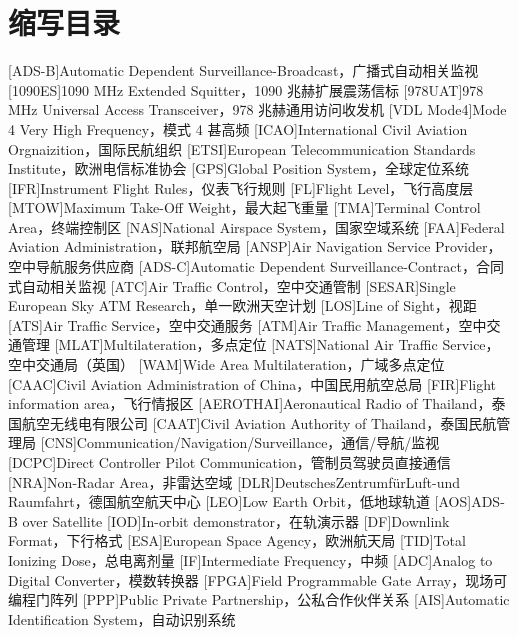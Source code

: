 
\chapter*{缩写目录}

\begin{acronym}
[ADS-B]{Automatic Dependent Surveillance-Broadcast，广播式自动相关监视}
[1090ES]{1090 MHz Extended Squitter，1090 兆赫扩展震荡信标}
[978UAT]{978 MHz Universal Access Transceiver，978 兆赫通用访问收发机}
[VDL Mode4]{Mode 4 Very High Frequency，模式 4 甚高频}
[ICAO]{International Civil Aviation Orgnaizition，国际民航组织}
[ETSI]{European Telecommunication Standards Institute，欧洲电信标准协会}
[GPS]{Global Position System，全球定位系统}
[IFR]{Instrument Flight Rules，仪表飞行规则}
[FL]{Flight Level，飞行高度层}
[MTOW]{Maximum Take-Off Weight，最大起飞重量}
[TMA]{Terminal Control Area，终端控制区}
[NAS]{National Airspace System，国家空域系统}
[FAA]{Federal Aviation Administration，联邦航空局}
[ANSP]{Air Navigation Service Provider，空中导航服务供应商}
[ADS-C]{Automatic Dependent Surveillance-Contract，合同式自动相关监视}
[ATC]{Air Traffic Control，空中交通管制}
[SESAR]{Single European Sky ATM Research，单一欧洲天空计划}
[LOS]{Line of Sight，视距}
[ATS]{Air Traffic Service，空中交通服务}
[ATM]{Air Traffic Management，空中交通管理}
[MLAT]{Multilateration，多点定位}
[NATS]{National Air Traffic Service，空中交通局（英国）}
[WAM]{Wide Area Multilateration，广域多点定位}
[CAAC]{Civil Aviation Administration of China，中国民用航空总局}
[FIR]{Flight information area，飞行情报区}
[AEROTHAI]{Aeronautical Radio of Thailand，泰国航空无线电有限公司}
[CAAT]{Civil Aviation Authority of Thailand，泰国民航管理局}
[CNS]{Communication/Navigation/Surveillance，通信/导航/监视}
[DCPC]{Direct Controller Pilot Communication，管制员驾驶员直接通信}
[NRA]{Non-Radar Area，非雷达空域}
[DLR]{DeutschesZentrumfürLuft-und Raumfahrt，德国航空航天中心}
[LEO]{Low Earth Orbit，低地球轨道}
[AOS]{ADS-B over Satellite}
[IOD]{In-orbit demonstrator，在轨演示器}
[DF]{Downlink Format，下行格式}
[ESA]{European Space Agency，欧洲航天局}
[TID]{Total Ionizing Dose，总电离剂量}
[IF]{Intermediate Frequency，中频}
[ADC]{Analog to Digital Converter，模数转换器}
[FPGA]{Field Programmable Gate Array，现场可编程门阵列}
[PPP]{Public Private Partnership，公私合作伙伴关系}
[AIS]{Automatic Identification System，自动识别系统}
\end{acronym}

\pagestyle{acronympage}